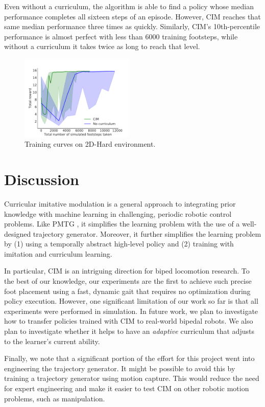 \documentclass[conference]{IEEEtran}
\begin{document}
Even without a curriculum, the algorithm is able to find a policy whose median performance completes all sixteen steps of an episode.
However, CIM reaches that same median performance three times as quickly.
Similarly, CIM's 10th-percentile performance is almost perfect with less than 6000 training footsteps, while without a curriculum it takes twice as long to reach that level.

\begin{figure}
  \includegraphics[width=0.48\textwidth]{../figures/nocur_baseline.pdf}
  \caption{\label{fig:nocur baseline} Training curves on 2D-Hard environment.}
\end{figure}

\section{Discussion}

Curricular imitative modulation is a general approach to integrating prior knowledge with machine learning in challenging, periodic robotic control problems.
Like PMTG \citep{iscen2018pmtg}, it simplifies the learning problem with the use of a well-designed trajectory generator.
Moreover, it further simplifies the learning problem by (1) using a temporally abstract high-level policy and (2) training with imitation and curriculum learning.

In particular, CIM is an intriguing direction for biped locomotion research.
To the best of our knowledge, our experiments are the first to achieve such precise foot placement
using a fast, dynamic gait that requires no optimization during policy execution.
However, one significant limitation of our work so far is that all experiments were performed in simulation.
In future work, we plan to investigate how to transfer policies trained with CIM to real-world bipedal robots.
We also plan to investigate whether it helps to have an \emph{adaptive} curriculum that adjusts to the learner's current ability.

Finally, we note that a significant portion of the effort for this project went into engineering the trajectory generator.
It might be possible to avoid this by training a trajectory generator using motion capture.
This would reduce the need for expert engineering and make it easier to test CIM on other robotic motion problems, such as manipulation.
\end{document}
